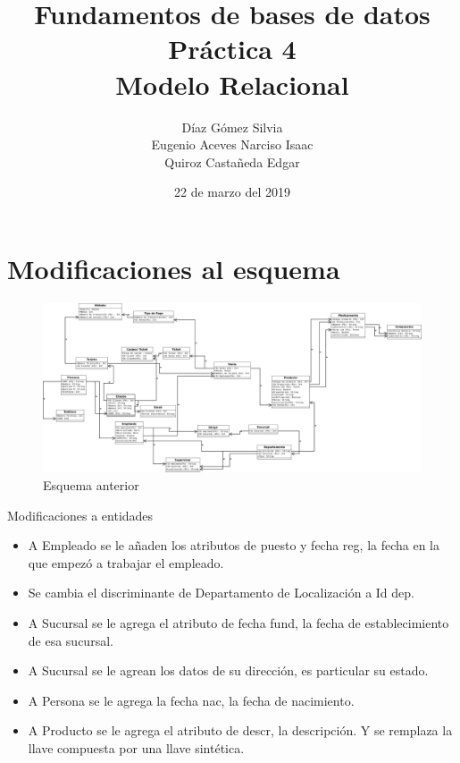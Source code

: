\documentclass{article}
\begin{document}
    \title{
        Fundamentos de bases de datos \\
        Práctica 4 \\
        Modelo Relacional
    }
    \author{
        Díaz Gómez Silvia \\
        Eugenio Aceves Narciso Isaac \\
        Quiroz Castañeda Edgar
    }
    \date {
        22 de marzo del 2019    
    }
    \maketitle
    \section{Modificaciones al esquema}
    \begin{figure}[H]
        \includegraphics[scale=0.22]{img/practica04.jpeg}
        \caption{Esquema anterior}
    \end{figure}
    Modificaciones a entidades
    \begin{itemize}
        \item A Empleado se le añaden los atributos de puesto y fecha reg, la
        fecha en la que empezó a trabajar el empleado.
        \item Se cambia el discriminante de Departamento de Localización a Id dep.
        \item A Sucursal se le agrega el atributo de fecha fund, la fecha de 
        establecimiento de esa sucursal.
        \item A Sucursal se le agrean los datos de su dirección, es particular su
        estado.
        \item A Persona se le agrega la fecha nac, la fecha de nacimiento.
        \item A Producto se le agrega el atributo de descr, la descripción. Y 
        se remplaza la llave compuesta por una llave sintética.
    \end{itemize}
\end{document}
